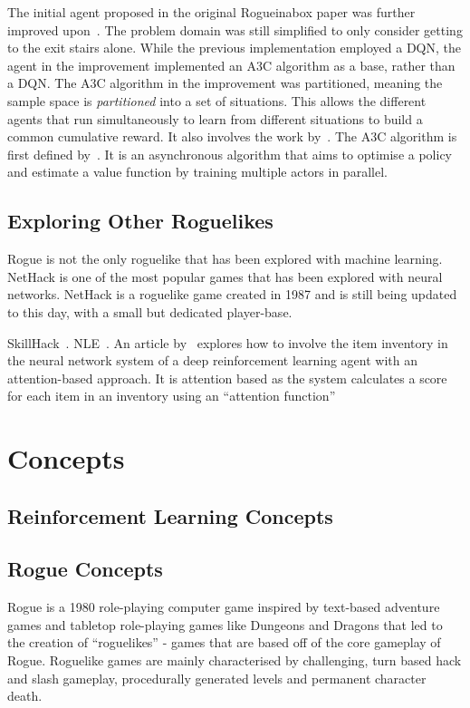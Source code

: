 \documentclass[12pt,a4paper]{article}
\begin{document}
    The initial agent proposed in the original Rogueinabox paper was further improved upon~\citep{asperti18}.
    The problem domain was still simplified to only consider getting to the exit stairs alone.
    While the previous implementation employed a DQN, the agent in the improvement implemented an A3C algorithm as a base, rather than a DQN. The A3C algorithm in the improvement was partitioned, meaning the sample space is \emph{partitioned} into a set of situations.
    This allows the different agents that run simultaneously to learn from different situations to build a common cumulative reward.
    It also involves the work by~\citet{jaderberg16}.
    The A3C algorithm is first defined by~\citet{mnih15}.
    It is an asynchronous algorithm that aims to optimise a policy and estimate a value function by training multiple actors in parallel.

    \subsection{Exploring Other Roguelikes}\label{subsec:exploring-other-roguelikes}

    Rogue is not the only roguelike that has been explored with machine learning.
    NetHack is one of the most popular games that has been explored with neural networks.
    NetHack is a roguelike game created in 1987 and is still being updated to this day, with a small but dedicated player-base.

    SkillHack~\citep{matthews22}.
    NLE~\citep{kuttler20}.
    An article by~\citet{izumiya21} explores how to involve the item inventory in the neural network system of a deep reinforcement learning agent with an attention-based approach.
    It is attention based as the system calculates a score for each item in an inventory using an ``attention function''

    \section{Concepts}\label{sec:concepts}

    \subsection{Reinforcement Learning Concepts}\label{subsec:reinforcement-learning-concepts}

    \subsection{Rogue Concepts}\label{subsec:rogue-concepts}
    Rogue is a 1980 role-playing computer game inspired by text-based adventure games and tabletop role-playing games like Dungeons and Dragons that led to the creation of ``roguelikes'' - games that are based off of the core gameplay of Rogue.
    Roguelike games are mainly characterised by challenging, turn based hack and slash gameplay, procedurally generated levels and permanent character death.
\end{document}
